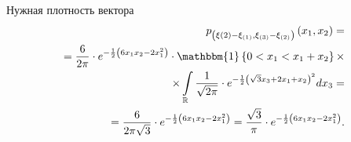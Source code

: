 \begin{enumerate}[label=\alph*)]
  Нужная плотность вектора
  \begin{equation*}
    \begin{split}
      p_{ \left( \xi{ \left( 2 \right) } - \xi_{ \left( 1 \right) }, \xi_{ \left( 3 \right) } - \xi_{ \left( 2 \right) } \right) }
        \left( x_1, x_2 \right) = \\
      = \frac{6}{2 \pi } \cdot e^{- \frac{1}{2} \left( 6x_1 x_2 - 2x_1^2 \right) } \cdot
      \mathbbm{1} \left\{ 0 < x_1 < x_1 + x_2 \right\} \times \\
      \times \int \limits_{ \mathbb{R}}
        \frac{1}{ \sqrt{2 \pi }} \cdot e^{- \frac{1}{2} \left( \sqrt{3} x_3 + 2x_1 + x_2 \right)^2}
      dx_3 = \\
      = \frac{6}{2 \pi \sqrt{3}} \cdot e^{- \frac{1}{2} \left( 6x_1 x_2 - 2x_1^2 \right) } =
      \frac{ \sqrt{3}}{ \pi } \cdot e^{- \frac{1}{2} \left( 6x_1 x_2 - 2x_1^2 \right) }.
    \end{split}
  \end{equation*}
\end{enumerate}
